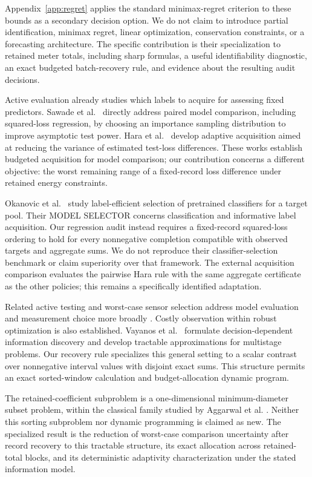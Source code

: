 \documentclass[12pt]{article}
\begin{document}
Appendix~\ref{app:regret} applies the standard minimax-regret criterion
\cite{savage,manskiregret} to these bounds as a secondary decision option.
We do not claim to introduce partial identification, minimax regret, linear
optimization, conservation constraints, or a forecasting architecture. The
specific contribution is their specialization to retained meter totals,
including sharp formulas, a useful identifiability diagnostic, an exact
budgeted batch-recovery rule, and evidence about the resulting audit decisions.

Active evaluation already studies which labels to acquire for assessing
fixed predictors. Sawade et al.\ \cite{sawade} directly address paired model
comparison, including squared-loss regression, by choosing an importance
sampling distribution to improve asymptotic test power. Hara et al.\
\cite{hara} develop adaptive acquisition aimed at reducing the variance of
estimated test-loss differences. These works establish budgeted acquisition
for model comparison; our contribution concerns a different objective:
the worst remaining range of a fixed-record loss difference under retained
energy constraints.

Okanovic et al.~\cite{okanovic2025} study label-efficient selection of
pretrained classifiers for a target pool. Their MODEL SELECTOR concerns
classification and informative label acquisition. Our regression audit
instead requires a fixed-record squared-loss ordering to hold for every
nonnegative completion compatible with observed targets and aggregate sums.
We do not reproduce their classifier-selection benchmark or claim superiority
over that framework. The external acquisition comparison evaluates the
pairwise Hara rule with the same aggregate certificate as the other policies;
this remains a specifically identified adaptation.

Related active testing and worst-case sensor selection address model
evaluation and measurement choice more broadly \cite{active,sensorsel}.
Costly observation within robust optimization is also established.
Vayanos et al.\ \cite{ddid} formulate decision-dependent information
discovery and develop tractable approximations for multistage problems.
Our recovery rule specializes this general setting to a scalar contrast
over nonnegative interval values with disjoint exact sums. This structure
permits an exact sorted-window calculation and budget-allocation dynamic
program.

The retained-coefficient subproblem is a one-dimensional minimum-diameter
subset problem, within the classical family studied by Aggarwal et al.
\cite{aggarwal}. Neither this sorting subproblem nor dynamic programming
is claimed as new. The specialized result is the reduction of worst-case
comparison uncertainty after record recovery to this tractable structure,
its exact allocation across retained-total blocks, and its deterministic
adaptivity characterization under the stated information model.
\end{document}
